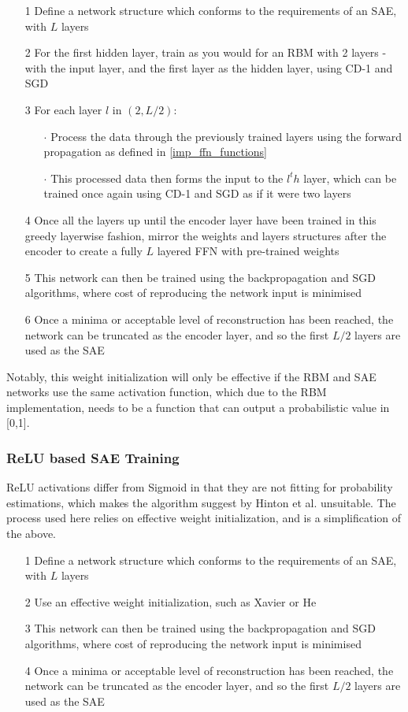 \documentclass[a4paper,latin]{paper}
\begin{document}
\begin{itemize}
	\item [1] Define a network structure which conforms to the requirements of an SAE, with $L$ layers
	\item [2] For the first hidden layer, train as you would for an RBM with 2 layers - with the input layer, and the first layer as the hidden layer, using CD-1 and SGD
	\item [3] For each layer $l$ in $(2, L/2)$:
	\begin{itemize}
		\item [$\cdot$] Process the data through the previously trained layers using the forward propagation as defined in \ref{imp_ffn_functions}
		\item [$\cdot$] This processed data then forms the input to the $l^th$ layer, which can be trained once again using CD-1 and SGD as if it were two layers
	\end{itemize}
	\item[4] Once all the layers up until the encoder layer have been trained in this greedy layerwise fashion, mirror the weights and layers structures after the encoder to create a fully $L$ layered FFN with pre-trained weights
	\item [5] This network can then be trained using the backpropagation and SGD algorithms, where cost of reproducing the network input is minimised
	\item [6] Once a minima or acceptable level of reconstruction has been reached, the network can be truncated as the encoder layer, and so the first $L/2$ layers are used as the SAE
\end{itemize}

Notably, this weight initialization will only be effective if the RBM and SAE networks use the same activation function, which due to the RBM implementation, needs to be a function that can output a probabilistic value in [0,1].

\subsubsection{ReLU based SAE Training}\label{imp_relusae}

ReLU activations differ from Sigmoid in that they are not fitting for probability estimations, which makes the algorithm suggest by Hinton et al. unsuitable. The process used here relies on effective weight initialization, and is a simplification of the above.

\begin{itemize}
	\item [1] Define a network structure which conforms to the requirements of an SAE, with $L$ layers
	\item [2] Use an effective weight initialization, such as Xavier or He
	\item [3] This network can then be trained using the backpropagation and SGD algorithms, where cost of reproducing the network input is minimised
	\item [4] Once a minima or acceptable level of reconstruction has been reached, the network can be truncated as the encoder layer, and so the first $L/2$ layers are used as the SAE
\end{itemize}
\end{document}
